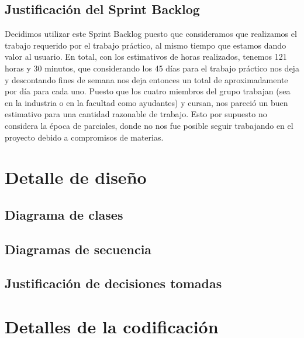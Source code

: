\documentclass[10pt, a4paper,english,spanish]{article}
\begin{document}
\subsection{Justificación del Sprint Backlog}

Decidimos utilizar este Sprint Backlog puesto que consideramos que realizamos el trabajo requerido por el trabajo práctico, al mismo tiempo que estamos dando valor al usuario. En total, con los estimativos de horas realizados, tenemos 121 horas y 30 minutos, que considerando los 45 días para el trabajo práctico nos deja y descontando fines de semana nos deja entonces un total de aproximadamente  por día para cada uno. Puesto que los cuatro miembros del grupo trabajan (sea en la industria o en la facultad como ayudantes) y cursan, nos pareció un buen estimativo para una cantidad razonable de trabajo. Esto por supuesto no considera la época de parciales, donde no nos fue posible seguir trabajando en el proyecto debido a compromisos de materias.

\section{Detalle de diseño}



\subsection{Diagrama de clases}

\subsection{Diagramas de secuencia}

\subsection{Justificación de decisiones tomadas}

\section{Detalles de la codificación}
\end{document}
